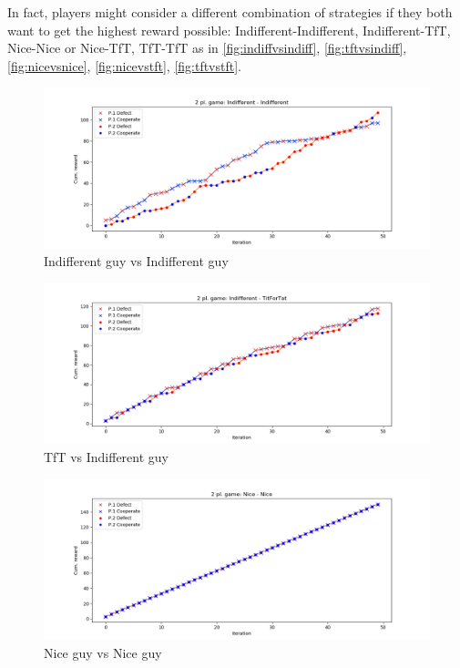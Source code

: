 \documentclass[journal,a4paper,10pt,twoside]{IEEEtran}
\begin{document}
In fact, players might consider a different combination of strategies if they both want to get the highest reward possible: Indifferent-Indifferent, Indifferent-TfT, Nice-Nice or Nice-TfT, TfT-TfT as in \autoref{fig:indiffvsindiff}, \autoref{fig:tftvsindiff}, \autoref{fig:nicevsnice}, \autoref{fig:nicevstft}, \autoref{fig:tftvstft}.

\begin{figure}[ht]
    \centering
    \includegraphics[width=1\columnwidth]{../img/ipd2p-rewards-Indifferent-Indifferent.png}
    \caption{Indifferent guy vs Indifferent guy}
    \label{fig:indiffvsindiff}
\end{figure}

\begin{figure}[ht]
    \centering
    \includegraphics[width=1\columnwidth]{../img/ipd2p-rewards-Indifferent-TitForTat.png}
    \caption{TfT vs Indifferent guy}
    \label{fig:tftvsindiff}
\end{figure}

\begin{figure}[ht]
    \centering
    \includegraphics[width=1\columnwidth]{../img/ipd2p-rewards-Nice-Nice.png}
    \caption{Nice guy vs Nice guy}
    \label{fig:nicevsnice}
\end{figure}
\end{document}

